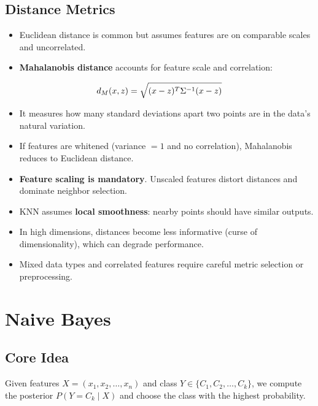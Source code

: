 \documentclass[10pt,a4paper]{article}
\begin{document}
		\subsection{Distance Metrics}
		\begin{itemize}
			\item Euclidean distance is common but assumes features are on comparable scales and uncorrelated.
			\item \textbf{Mahalanobis distance} accounts for feature scale and correlation:
		\end{itemize}
	
		\begin{align*}
			\Large d_M(x, z)=\sqrt{(x - z)^T \Sigma^{-1} (x - z)}
		\end{align*}
	
		\begin{itemize}
			\item It measures how many standard deviations apart two points are in the data's natural variation.
			\item If features are whitened (variance $=1$ and no correlation), Mahalanobis reduces to Euclidean distance.
		\end{itemize}
	
		\begin{itemize}
			\item \textbf{Feature scaling is mandatory}. Unscaled features distort distances and dominate neighbor selection.
			\item KNN assumes \textbf{local smoothness}: nearby points should have similar outputs.
			\item In high dimensions, distances become less informative (curse of dimensionality), which can degrade performance.
			\item Mixed data types and correlated features require careful metric selection or preprocessing.
		\end{itemize}
	
		\section{Naive Bayes}
	
		\subsection{Core Idea}
		Given features $X=(x_1,x_2,\dots,x_n)$ and class $Y \in \{C_1, C_2, \dots, C_k\}$, we compute the posterior $P(Y=C_k\mid X)$ and choose the class with the highest probability.
	
\end{document}
